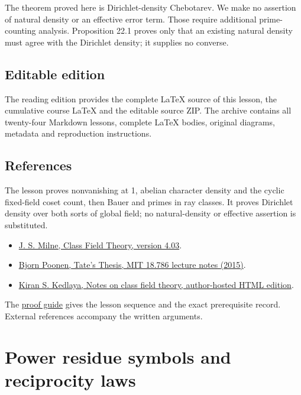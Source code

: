 \documentclass[11pt,a4paper]{article}
\newcommand{\tightlist}{\setlength{\itemsep}{0pt}\setlength{\parskip}{0pt}}
\begin{document}
The theorem proved here is Dirichlet-density Chebotarev. We make no
assertion of natural density or an effective error term. Those require
additional prime-counting analysis. Proposition 22.1 proves only that an
existing natural density must agree with the Dirichlet density; it
supplies no converse.

\subsection{Editable edition}\label{editable-edition}

The reading edition provides the complete LaTeX source of this lesson,
the cumulative course LaTeX and the editable source ZIP. The archive
contains all twenty-four Markdown lessons, complete LaTeX bodies,
original diagrams, metadata and reproduction instructions.

\subsection{References}\label{references}

The lesson proves nonvanishing at 1, abelian character density and the
cyclic fixed-field coset count, then Bauer and primes in ray classes. It
proves Dirichlet density over both sorts of global field; no
natural-density or effective assertion is substituted.

\begin{itemize}
\tightlist
\item
  \href{https://www.jmilne.org/math/CourseNotes/CFT.pdf}{J. S. Milne,
  Class Field Theory, version 4.03}.
\item
  \href{https://math.mit.edu/~poonen/786/notes.pdf}{Bjorn Poonen, Tate's
  Thesis, MIT 18.786 lecture notes (2015)}.
\item
  \href{https://kskedlaya.org/cft/sec_abstractcft1.html}{Kiran S.
  Kedlaya, Notes on class field theory, author-hosted HTML edition}.
\end{itemize}

The \href{../free-proofs.html}{proof guide} gives the lesson sequence
and the exact prerequisite record. External references accompany the
written arguments.

\clearpage
\section{Power residue symbols and reciprocity
laws}\label{power-residue-symbols-and-reciprocity-laws}
\end{document}
